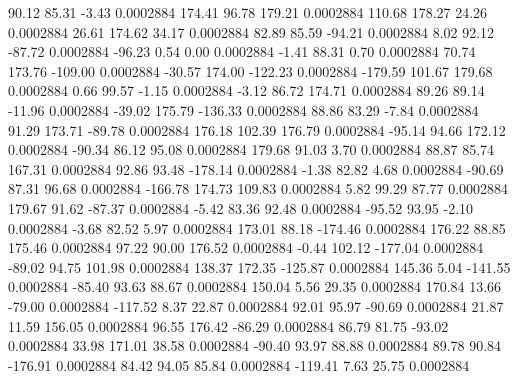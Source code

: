        90.12       85.31       -3.43     0.0002884
      174.41       96.78      179.21     0.0002884
      110.68      178.27       24.26     0.0002884
       26.61      174.62       34.17     0.0002884
       82.89       85.59      -94.21     0.0002884
        8.02       92.12      -87.72     0.0002884
      -96.23        0.54        0.00     0.0002884
       -1.41       88.31        0.70     0.0002884
       70.74      173.76     -109.00     0.0002884
      -30.57      174.00     -122.23     0.0002884
     -179.59      101.67      179.68     0.0002884
        0.66       99.57       -1.15     0.0002884
       -3.12       86.72      174.71     0.0002884
       89.26       89.14      -11.96     0.0002884
      -39.02      175.79     -136.33     0.0002884
       88.86       83.29       -7.84     0.0002884
       91.29      173.71      -89.78     0.0002884
      176.18      102.39      176.79     0.0002884
      -95.14       94.66      172.12     0.0002884
      -90.34       86.12       95.08     0.0002884
      179.68       91.03        3.70     0.0002884
       88.87       85.74      167.31     0.0002884
       92.86       93.48     -178.14     0.0002884
       -1.38       82.82        4.68     0.0002884
      -90.69       87.31       96.68     0.0002884
     -166.78      174.73      109.83     0.0002884
        5.82       99.29       87.77     0.0002884
      179.67       91.62      -87.37     0.0002884
       -5.42       83.36       92.48     0.0002884
      -95.52       93.95       -2.10     0.0002884
       -3.68       82.52        5.97     0.0002884
      173.01       88.18     -174.46     0.0002884
      176.22       88.85      175.46     0.0002884
       97.22       90.00      176.52     0.0002884
       -0.44      102.12     -177.04     0.0002884
      -89.02       94.75      101.98     0.0002884
      138.37      172.35     -125.87     0.0002884
      145.36        5.04     -141.55     0.0002884
      -85.40       93.63       88.67     0.0002884
      150.04        5.56       29.35     0.0002884
      170.84       13.66      -79.00     0.0002884
     -117.52        8.37       22.87     0.0002884
       92.01       95.97      -90.69     0.0002884
       21.87       11.59      156.05     0.0002884
       96.55      176.42      -86.29     0.0002884
       86.79       81.75      -93.02     0.0002884
       33.98      171.01       38.58     0.0002884
      -90.40       93.97       88.88     0.0002884
       89.78       90.84     -176.91     0.0002884
       84.42       94.05       85.84     0.0002884
     -119.41        7.63       25.75     0.0002884
